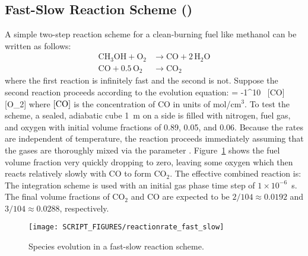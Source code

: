 \documentclass[11pt]{book}
\begin{document}
\FloatBarrier

\subsection{Fast-Slow Reaction Scheme (\texorpdfstring{}{reactionrate\_fast\_slow})}
\label{reactionrate_fast_slow}

A simple two-step reaction scheme for a clean-burning fuel like methanol can be written as follows:
\begin{subequations}
\begin{align}
\label{methanol_step1}
\mathrm{CH_3OH + O_2} &\rightarrow \mathrm{CO + 2 \, H_2O} \\
\label{methanol_step2}
\mathrm{CO + 0.5 \, O_2} &\rightarrow \mathrm{CO_2}
\end{align}
\end{subequations}
where the first reaction is infinitely fast and the second is not. Suppose the second reaction proceeds according to the evolution equation:
\be
    = -1^{10} \, [{\rm CO}] \, [{\rm O_2}]
\ee
where $[{\rm CO}]$ is the concentration of CO in units of mol/cm$^3$. To test the scheme, a sealed, adiabatic cube 1~m on a side is filled with nitrogen, fuel gas, and oxygen with initial volume fractions of 0.89, 0.05, and 0.06. Because the rates are independent of temperature, the reaction proceeds immediately assuming that the gases are thoroughly mixed via the parameter . Figure~\ref{fig:reactionrate_fast_slow} shows the fuel volume fraction very quickly dropping to zero, leaving some oxygen which then reacts relatively slowly with CO to form CO$_2$. The effective combined reaction is:
\be
\label{methanol_combined}
 \rightarrow {}
\ee
The  integration scheme is used with an initial gas phase time step of $1\times 10^{-6}$~s. The final volume fractions of CO$_2$ and CO are expected to be $2/104 \approx 0.0192$ and $3/104 \approx 0.0288$, respectively.

\begin{figure}[!ht]
\centering
\texttt{[image: SCRIPT\_FIGURES/reactionrate\_fast\_slow]}
\caption[Species evolution in a fast-slow reaction scheme]{Species evolution in a fast-slow reaction scheme.}
\label{fig:reactionrate_fast_slow}
\end{figure}

\FloatBarrier
\end{document}
